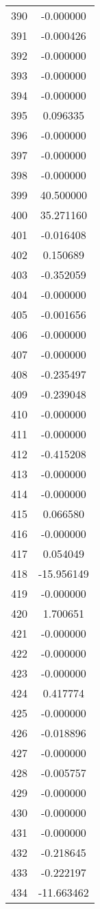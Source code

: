 \documentclass[12pt]{article}
\begin{document}
\begin{longtable}{@{}cc@{}}
390 & -0.000000 \\
391 & -0.000426 \\
392 & -0.000000 \\
393 & -0.000000 \\
394 & -0.000000 \\
395 & 0.096335 \\
396 & -0.000000 \\
397 & -0.000000 \\
398 & -0.000000 \\
399 & 40.500000 \\
400 & 35.271160 \\
401 & -0.016408 \\
402 & 0.150689 \\
403 & -0.352059 \\
404 & -0.000000 \\
405 & -0.001656 \\
406 & -0.000000 \\
407 & -0.000000 \\
408 & -0.235497 \\
409 & -0.239048 \\
410 & -0.000000 \\
411 & -0.000000 \\
412 & -0.415208 \\
413 & -0.000000 \\
414 & -0.000000 \\
415 & 0.066580 \\
416 & -0.000000 \\
417 & 0.054049 \\
418 & -15.956149 \\
419 & -0.000000 \\
420 & 1.700651 \\
421 & -0.000000 \\
422 & -0.000000 \\
423 & -0.000000 \\
424 & 0.417774 \\
425 & -0.000000 \\
426 & -0.018896 \\
427 & -0.000000 \\
428 & -0.005757 \\
429 & -0.000000 \\
430 & -0.000000 \\
431 & -0.000000 \\
432 & -0.218645 \\
433 & -0.222197 \\
434 & -11.663462 \\

\end{longtable}
\end{document}
